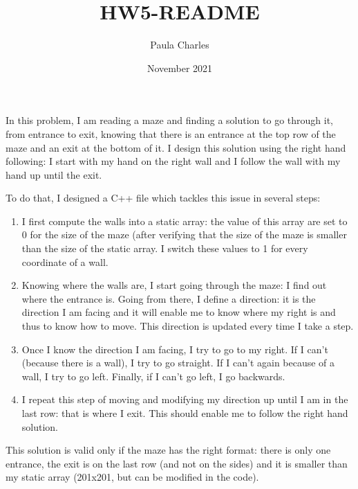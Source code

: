 \documentclass{article}
\title{HW5-README}
\author{Paula Charles}
\date{November 2021}
\begin{document}
\maketitle

\noindent
In this problem, I am reading a maze and finding
 a solution to go through it, from entrance to 
exit, knowing that there is an entrance at the 
top row of the maze 
and an exit at the bottom of it.
 I design this solution using the right hand
 following: I start with my hand on the right wall
 and I follow the wall with my hand up until the 
exit.
\newline

\noindent
To do that, I designed a C++ file which tackles 
this issue in several steps:
\begin{enumerate}
    \item I first compute the walls into a static
 array: the value of this array are set to 0 for 
the size of the maze (after verifying that the 
size of the maze is smaller than the size of the 
static array. I switch these values to 1 for every
 coordinate of a wall.
    \item Knowing where the walls are, I start going
 through the maze: I find out where the entrance is.
 Going from there, I define a direction: it is the 
direction I am facing and it will enable me to know 
where my right is and thus to know how to move. This
 direction is updated every time I take a step.
    \item Once I know the direction I am facing, I 
try to go to my right. If I can't (because there is 
a wall), I try to go straight. If I can't again 
because of a wall, I try to go left. Finally, if 
I can't go left, I go backwards.
    \item I repeat this step of moving and modifying
 my direction up until I am in the last row: that is
 where I exit. This should enable me to follow the 
right hand solution.
\end{enumerate}
\newline

\noindent
This solution is valid only if the maze has the right 
format: there is only one entrance, the exit is on 
the last row (and not on the sides) and it is smaller
 than my static array (201x201, but can be modified in
 the code).
\newline
\end{document}
